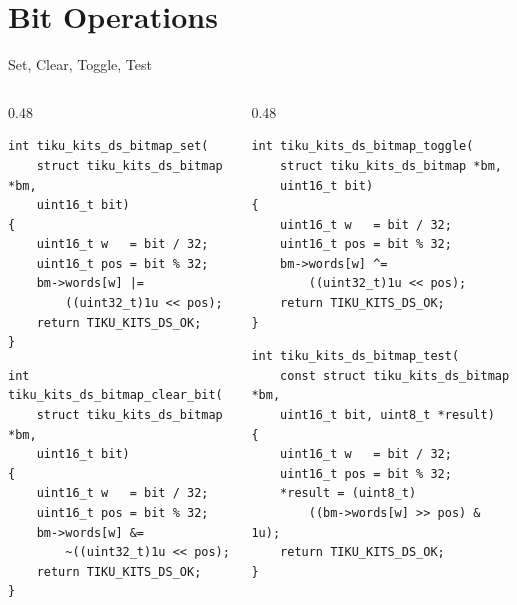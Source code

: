 \documentclass[aspectratio=169, 10pt]{beamer}
\begin{document}
\section{Bit Operations}

\begin{frame}[fragile]{Set, Clear, Toggle, Test}
\begin{columns}[T]
\begin{column}{0.48\textwidth}
\begin{lstlisting}[style=cstyle,
  title={Set --- OR with mask}]
int tiku_kits_ds_bitmap_set(
    struct tiku_kits_ds_bitmap *bm,
    uint16_t bit)
{
    uint16_t w   = bit / 32;
    uint16_t pos = bit % 32;
    bm->words[w] |=
        ((uint32_t)1u << pos);
    return TIKU_KITS_DS_OK;
}
\end{lstlisting}

\begin{lstlisting}[style=cstyle,
  title={Clear --- AND with complement}]
int tiku_kits_ds_bitmap_clear_bit(
    struct tiku_kits_ds_bitmap *bm,
    uint16_t bit)
{
    uint16_t w   = bit / 32;
    uint16_t pos = bit % 32;
    bm->words[w] &=
        ~((uint32_t)1u << pos);
    return TIKU_KITS_DS_OK;
}
\end{lstlisting}
\end{column}

\begin{column}{0.48\textwidth}
\begin{lstlisting}[style=cstyle,
  title={Toggle --- XOR with mask}]
int tiku_kits_ds_bitmap_toggle(
    struct tiku_kits_ds_bitmap *bm,
    uint16_t bit)
{
    uint16_t w   = bit / 32;
    uint16_t pos = bit % 32;
    bm->words[w] ^=
        ((uint32_t)1u << pos);
    return TIKU_KITS_DS_OK;
}
\end{lstlisting}

\begin{lstlisting}[style=cstyle,
  title={Test --- shift and mask}]
int tiku_kits_ds_bitmap_test(
    const struct tiku_kits_ds_bitmap *bm,
    uint16_t bit, uint8_t *result)
{
    uint16_t w   = bit / 32;
    uint16_t pos = bit % 32;
    *result = (uint8_t)
        ((bm->words[w] >> pos) & 1u);
    return TIKU_KITS_DS_OK;
}
\end{lstlisting}
\end{column}
\end{columns}
\end{frame}
\end{document}
